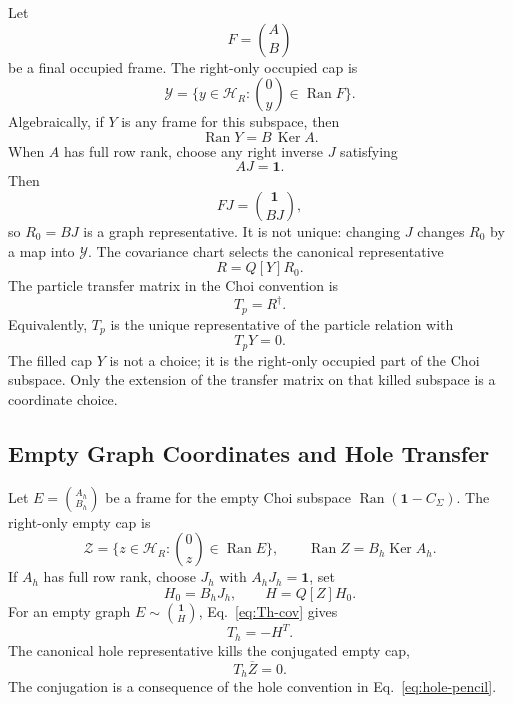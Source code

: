 \documentclass[aps,prb,onecolumn,nofootinbib,superscriptaddress]{revtex4-2}
\newcommand{\cH}{\mathcal H}
\newcommand{\cY}{\mathcal Y}
\newcommand{\cZ}{\mathcal Z}
\newcommand{\Id}{\mathbf{1}}
\newcommand{\Ran}{\operatorname{Ran}}
\newcommand{\Ker}{\operatorname{Ker}}
\begin{document}
Let
\begin{equation}
  F=\binom{A}{B}
\end{equation}
be a final occupied frame.  The right-only occupied cap is
\begin{equation}
  \cY=\{y\in\cH_R:\binom{0}{y}\in\Ran F\}.
  \label{eq:Y-definition}
\end{equation}
Algebraically, if \(Y\) is any frame for this subspace, then
\begin{equation}
  \Ran Y=B\,\Ker A .
  \label{eq:Y-BkerA}
\end{equation}
When \(A\) has full row rank, choose any right inverse \(J\) satisfying
\begin{equation}
  AJ=\Id .
\end{equation}
Then
\begin{equation}
  FJ=\binom{\Id}{BJ},
\end{equation}
so \(R_0=BJ\) is a graph representative.  It is not unique: changing \(J\)
changes \(R_0\) by a map into \(\cY\).  The covariance chart selects the
canonical representative
\begin{equation}
  R=Q[Y]R_0.
  \label{eq:canonical-R}
\end{equation}
The particle transfer matrix in the Choi convention is
\begin{equation}
  T_p=R^\dagger.
  \label{eq:Tp-frame}
\end{equation}
Equivalently, \(T_p\) is the unique representative of the particle relation
with
\begin{equation}
  T_pY=0.
  \label{eq:Tp-kills-Y}
\end{equation}
The filled cap \(Y\) is not a choice; it is the right-only occupied part of
the Choi subspace.  Only the extension of the transfer matrix on that killed
subspace is a coordinate choice.

\subsection{Empty Graph Coordinates and Hole Transfer}

Let \(E=\binom{A_h}{B_h}\) be a frame for the empty Choi subspace
\(\Ran(\Id-C_\Sigma)\).  The right-only empty cap is
\begin{equation}
  \cZ=\{z\in\cH_R:\binom{0}{z}\in\Ran E\},
  \qquad
  \Ran Z=B_h\Ker A_h .
  \label{eq:Z-definition}
\end{equation}
If \(A_h\) has full row rank, choose \(J_h\) with \(A_hJ_h=\Id\), set
\begin{equation}
  H_0=B_hJ_h,\qquad H=Q[Z]H_0.
\end{equation}
For an empty graph \(E\sim \binom{\Id}{H}\), Eq.~\eqref{eq:Th-cov} gives
\begin{equation}
  T_h=-H^T .
  \label{eq:Th-frame}
\end{equation}
The canonical hole representative kills the conjugated empty cap,
\begin{equation}
  T_h\overline{Z}=0.
\end{equation}
The conjugation is a consequence of the hole convention in
Eq.~\eqref{eq:hole-pencil}.
\end{document}
